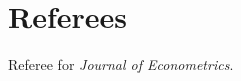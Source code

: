\documentclass[10pt,letterpaper]{article}
\renewenvironment{itemize}{
  \begin{list}{}{
      \setlength{\leftmargin}{1.5em}
      \setlength{\itemsep}{0.25em}
      \setlength{\parskip}{0pt}
      \setlength{\parsep}{0.25em}
    }
}{
  \end{list}
}
\begin{document}
\section*{Referees}
\begin{itemize}
\item Referee for \textit{Journal of Econometrics}.
\end{itemize}
%
\end{document}
